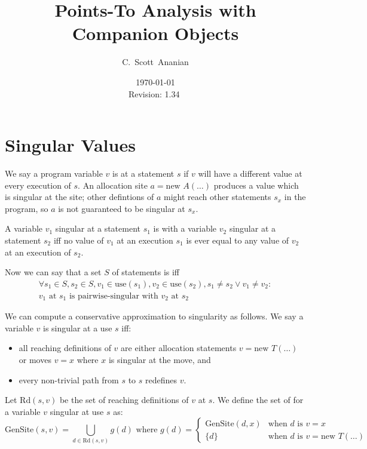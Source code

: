 \documentclass[11pt,notitlepage]{article}
\author{C.~Scott~Ananian}
\title{Points-To Analysis with Companion Objects}
\date{\today \\ $ $Revision: 1.34 $ $}
\begin{document}

\maketitle
\section{Singular Values}

We say a program variable $v$ is  at a statement $s$
if $v$ will have a different value at every execution of $s$.  An
allocation site $a = \text{new }A(\ldots)$ produces a value which is singular
at the site; other defintions of $a$ might reach other statements
$s_x$ in the program, so $a$ is not guaranteed to be singular at $s_x$.

A variable $v_1$ singular at a statement $s_1$ is
 with a variable $v_2$ singular at a statement
$s_2$ iff no value of $v_1$ at an execution $s_1$ is ever equal to any
value of $v_2$ at an execution of $s_2$.

Now we can say that a set $S$ of statements is
 iff
\begin{multline*}
\forall s_1 \in S, s_2 \in S, v_1 \in \text{use}(s_1), v_2 \in \text{use}(s_2),
  s_1 \neq s_2 \vee v_1 \neq v_2:
\\
v_1 \text{ at } s_1 \text{ is pairwise-singular with } v_2 \text{ at } s_2
\end{multline*}

We can compute a conservative approximation to singularity as follows.
We say a variable $v$ is singular at a use $s$ iff:
\begin{itemize}
\item all reaching definitions of $v$ are either allocation statements 
$v = \text{new }T(\ldots)$ or moves $v = x$ where $x$ is singular at
the move, and
\item every non-trivial path from $s$ to $s$ redefines $v$.
\end{itemize}

Let $\text{Rd}(s,v)$ be the set of reaching definitions of $v$ at $s$.
We define the set of  for a variable $v$ singular at
use $s$ as:
\begin{displaymath}
\text{GenSite}(s,v) %
 =
\bigcup_{d \in \text{Rd}(s,v)} g(d)
\text{ where }
g(d) = \begin{cases}
                \text{GenSite}(d,x) &\text{when } d \text{ is } v=x \\
                \{d\}&\text{when } d \text{ is } v=\text{new } T(\ldots)
       \end{cases}
\end{displaymath}
\end{document}
